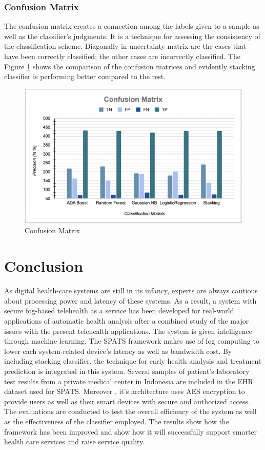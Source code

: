 \documentclass[10pt]{article}
\begin{document}
\subsubsection{Confusion Matrix}
The confusion matrix creates a connection among the labels given to a sample as well as the classifier's judgments. It is a technique for assessing the consistency of the classification scheme. Diagonally in uncertainty matrix are the cases that have been correctly classified; the other cases are incorrectly classified. 
The Figure \ref{fig:12} shows the comparison of the confusion matrices and evidently stacking classifier is performing better compared to the rest.

\begin{figure}[H]
    \begin{center}
        \includegraphics[width=0.7\linewidth,frame]{CA2-template/RIC13.png}
       \caption{Confusion Matrix \label{fig:12}}
    \end{center}
\end{figure}

\section{Conclusion}
As digital health-care systems are still in its infancy, experts are always cautious about processing power and latency of these systems. As a result, a system with secure fog-based telehealth as a service has been developed for real-world applications of automatic health analysis after a combined study of the major issues with the present telehealth applications. The system is given intelligence through machine learning. The SPATS framework makes use of fog computing to lower each system-related device's latency as well as bandwidth cost. By including stacking classifier, the technique for early health analysis and treatment prediction is integrated in this system. Several samples of patient's laboratory test results from a private medical center in Indonesia are included in the EHR dataset used for SPATS. Moreover , it's architecture uses AES encryption to provide users as well as their smart devices with secure and authorized access. The evaluations are conducted to test the overall efficiency of the system as well as the effectiveness of the classifier employed. The results show how the framework has been improved and show how it will successfully support smarter health care services and raise service quality.
\end{document}
